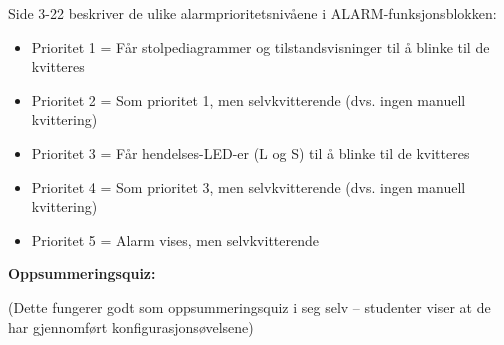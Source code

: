 \vskip 10pt

Side 3-22 beskriver de ulike alarmprioritetsnivåene i ALARM-funksjonsblokken:

\begin{itemize}
\item{} Prioritet 1 = Får stolpediagrammer og tilstandsvisninger til å blinke til de kvitteres
\item{} Prioritet 2 = Som prioritet 1, men selvkvitterende (dvs. ingen manuell kvittering)
\item{} Prioritet 3 = Får hendelses-LED-er (L og S) til å blinke til de kvitteres
\item{} Prioritet 4 = Som prioritet 3, men selvkvitterende (dvs. ingen manuell kvittering)
\item{} Prioritet 5 = Alarm vises, men selvkvitterende
\end{itemize}


















\vfil \eject

\noindent
{\bf Oppsummeringsquiz:}

(Dette fungerer godt som oppsummeringsquiz i seg selv -- studenter viser at de har gjennomført konfigurasjonsøvelsene)


